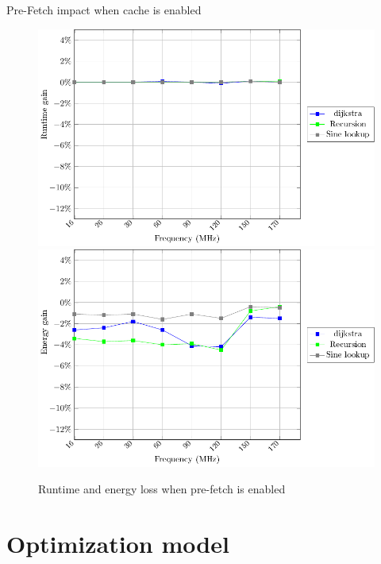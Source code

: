 \documentclass[
	11pt, %
]{beamer}
\begin{document}
\begin{frame}{Pre-Fetch impact when cache is enabled}
	\begin{figure}
		\includegraphics[scale = 0.4]{data/stm32g_v2/pre_fetch_impact_cache_on/duration.pdf}
		\includegraphics[scale = 0.4]{data/stm32g_v2/pre_fetch_impact_cache_on/energy.pdf}
		\caption{Runtime and energy loss when pre-fetch is enabled}
	\end{figure}
\end{frame}

\section{Optimization model}
\end{document}

